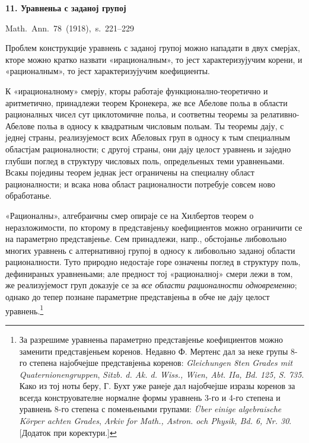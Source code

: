 ﻿\documentclass[11pt]{article}
\begin{document}

\begin{center}
{\Large\bfseries 11. Уравненьа с заданој групој}\par
\vspace{1.5em}
\mbox{Math. Ann. 78 (1918), s. 221--229}
\end{center}

\vspace{4em}

Проблем конструкције уравнень с заданој групој можно нападати в двух смерјах, кторе можно кратко назвати «ирационалным», то јест характеризујучим корени, и «рационалным», то јест характеризујучим коефициенты.

К «ирационалному» смерју, кторы работаје функционално-теоретично и аритметично, принадлежи теорем Кронекера, же все Абелове польа в области рационалных чисел сут циклотомичне польа, и соответны теоремы за релативно-Абелове польа в односу к квадратным числовым польам. Ты теоремы дају, с једнеј страны, реализујемост всих Абеловых груп в односу к тым специалным областјам рационалности; с другој страны, они дају целост уравнень и заједно глубши поглед в структуру числовых поль, определьеных теми уравненьами. Всакы поједины теорем једнак јест ограничены на специалну област рационалности; и всака нова област рационалности потребује совсем ново обработанье.

«Рационалны», алгебраичны смер опираје се на Хилбертов теорем о неразложимости, по кторому в представјеньу коефициентов можно ограничити се на параметрно представјенье. Сем принадлежи, напр., обстојанье либовольно многих уравнень с алтернативној групој в односу к либовольно заданој области рационалности. Туто природно недостаје горе означены поглед в структуру поль, дефинираных уравненьами; але предност тој «рационалној» смери лежи в том, же реализујемост груп доказује се за {\itshape все области рационалности одновременно}; однако до тепер познане параметрне представјеньа в обче не дају целост уравнень.\footnote{За разрешиме уравненьа параметрно представјенье коефициентов можно заменити представјеньем коренов. Недавно Ф. Мертенс дал за неке групы 8-го степена најобчејше представјеньа коренов: \emph{Gleichungen 8ten Grades mit Quaternionengruppen}, \emph{Sitzb. d. Ak. d. Wiss., Wien, Abt. IIa, Bd. 125, S. 735}. Како из тој ноты беру, Г. Бухт уже ранеје дал најобчејше изразы коренов за всегда конструователне нормалне формы уравнень 3-го и 4-го степена и уравнень 8-го степена с поменьеными групами: \emph{Über einige algebraische Körper achten Grades}, \emph{Arkiv for Math., Astron. och Physik, Bd. 6, Nr. 30}. [Додаток при коректури.]} 
\end{document}
